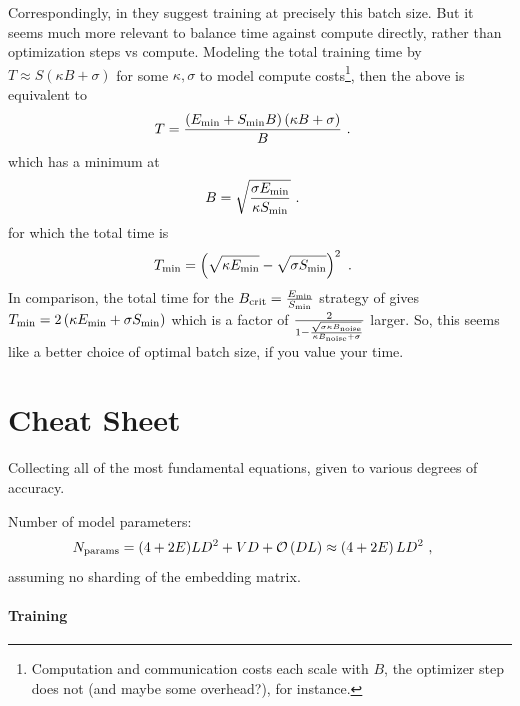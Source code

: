 \documentclass[11pt]{article}
\begin{document}
Correspondingly, in \cite{mccandlish2018empirical} they suggest training at precisely this batch
size.  But it seems much more relevant to balance time against compute directly, rather than
optimization steps vs compute. Modeling the total training time by $ T\approx S \left ( \kappa B + \sigma  \right)$
for some $ \kappa ,\sigma  $ to model compute costs\footnote{Computation and communication costs
each scale with $ B $, the optimizer step does not (and maybe some overhead?), for instance.}, then
the above is equivalent to
\begin{align}
    T &= \frac{\left ( E _{ {\rm min} } + S _{ {\rm min} } B \right) \left ( \kappa B+ \sigma   \right ) }{  B  }\ .
\end{align}
which has a minimum at
\begin{align}
    B &= \sqrt{\frac{ \sigma E _{ {\rm min} } }{ \kappa S _{ {\rm min} }   }}\ .
\end{align}
for which the total time is
\begin{align}
    T _{ {\rm  min} } &= \left ( \sqrt{\kappa E _{ {\rm  min} }} - \sqrt{\sigma S _{ {\rm min} }} \right ) ^{ 2 }\ .
\end{align}
In comparison, the total time for the $ B _{ {\rm  crit} } = \frac{ E _{ {\rm min} } }{ S _{ {\rm
min} } } $ strategy of \cite{mccandlish2018empirical} gives $ T _{ {\rm  min} } = 2 \left ( \kappa E
_{ {\rm min} } + \sigma S _{ {\rm min} } \right ) $ which is a factor of $ \frac{ 2 }{ 1- \frac{
    \sqrt{\sigma \kappa B _{ {\rm noise} } } }{ \kappa B _{ {\rm noise}  } + \sigma } } $ larger.
    So, this seems like a better choice of optimal batch size, if you value your time.


\section{Cheat Sheet \label{app_cheat_sheet}}

Collecting all of the most fundamental equations, given to various degrees of accuracy.

Number of model parameters:
\begin{align}
    N _{ {\rm params} } &=   (4+2E)LD ^{ 2 } + VD+ \mathcal{O} \left( DL \right) \approx   \left ( 4+2E \right )LD ^{ 2 }\ ,
\end{align}
assuming no sharding of the embedding matrix.


\paragraph{Training}
\end{document}
